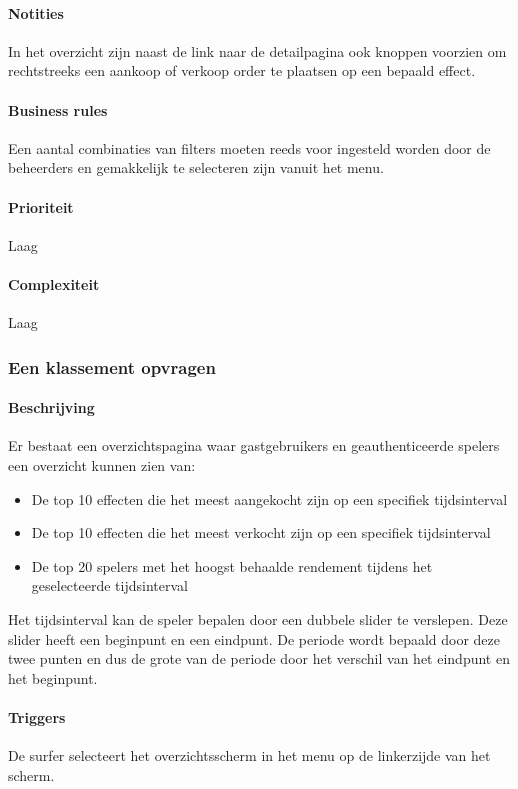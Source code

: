 \paragraph{Notities}In het overzicht zijn naast de link naar de detailpagina ook knoppen voorzien om rechtstreeks een aankoop of verkoop order te plaatsen op een bepaald effect.
\paragraph{Business rules}Een aantal combinaties van filters moeten reeds voor ingesteld worden door de beheerders en gemakkelijk te selecteren zijn vanuit het menu.
\paragraph{Prioriteit}Laag
\paragraph{Complexiteit}Laag

\subsubsection{Een klassement opvragen}

\paragraph{Beschrijving} Er bestaat een overzichtspagina waar gastgebruikers en geauthenticeerde spelers een overzicht kunnen zien van:
\begin{itemize}
	\item De top 10 effecten die het meest aangekocht zijn op een specifiek tijdsinterval
  \item De top 10 effecten die het meest verkocht zijn op een specifiek tijdsinterval
  \item De top 20 spelers met het hoogst behaalde rendement tijdens het geselecteerde tijdsinterval
\end{itemize}
Het tijdsinterval kan de speler bepalen door een dubbele slider te verslepen. Deze slider heeft een beginpunt en een eindpunt. De periode wordt bepaald door deze twee punten en dus de grote van de periode door het verschil van het eindpunt en het beginpunt.
\paragraph{Triggers} De surfer selecteert het overzichtsscherm in het menu op de linkerzijde van het scherm.
